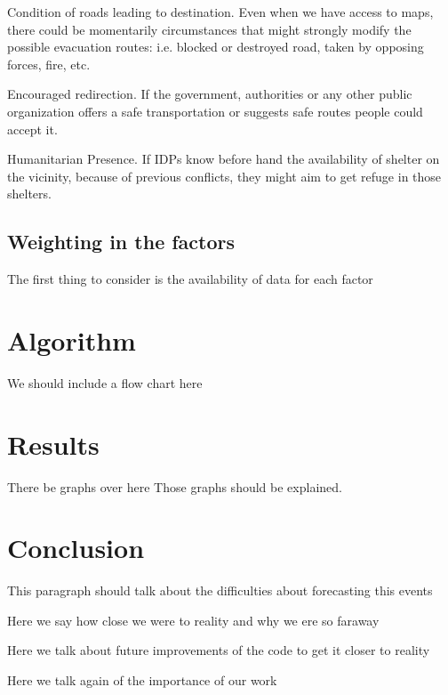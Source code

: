 \documentclass[11pt]{article}
\begin{document}
Condition of roads leading to destination.  Even when we have access to maps,
there could be momentarily circumstances that might strongly modify the possible
evacuation routes: i.e. blocked or destroyed road, taken by opposing forces,
fire, etc.

Encouraged redirection.
If the government, authorities or any other public organization offers a safe transportation or suggests safe routes people could accept it.

Humanitarian Presence.
If IDPs know before hand the availability of shelter on the vicinity, because of
previous conflicts, they might aim to get refuge in those shelters.
\subsection{Weighting in the factors}
\label{sec:orgheadline3}
The first thing to consider is the availability of data for each factor

\section{Algorithm}
\label{sec:orgheadline5}
We should include a flow chart here
\section{Results}
\label{sec:orgheadline6}
There be graphs over here
Those graphs should be explained.
\section{Conclusion}
\label{sec:orgheadline7}
This paragraph should talk about the difficulties about forecasting this events

Here we say how close we were to reality and why we ere so faraway

Here we talk about future improvements of the code to get it closer to reality

Here we talk again of the importance of our work
\end{document}
